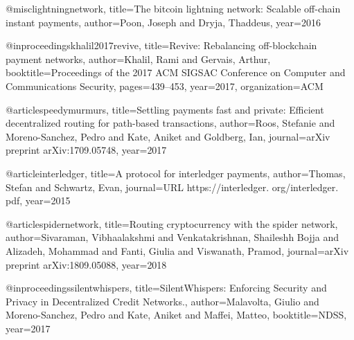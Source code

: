 @misc{lightningnetwork,
  title={The bitcoin lightning network: Scalable off-chain instant payments},
  author={Poon, Joseph and Dryja, Thaddeus},
  year={2016}
}

@inproceedings{khalil2017revive,
  title={Revive: Rebalancing off-blockchain payment networks},
  author={Khalil, Rami and Gervais, Arthur},
  booktitle={Proceedings of the 2017 ACM SIGSAC Conference on Computer and Communications Security},
  pages={439--453},
  year={2017},
  organization={ACM}
}

@article{speedymurmurs,
  title={Settling payments fast and private: Efficient decentralized routing for path-based transactions},
  author={Roos, Stefanie and Moreno-Sanchez, Pedro and Kate, Aniket and Goldberg, Ian},
  journal={arXiv preprint arXiv:1709.05748},
  year={2017}
}

@article{interledger,
  title={A protocol for interledger payments},
  author={Thomas, Stefan and Schwartz, Evan},
  journal={URL https://interledger. org/interledger. pdf},
  year={2015}
}

@article{spidernetwork,
  title={Routing cryptocurrency with the spider network},
  author={Sivaraman, Vibhaalakshmi and Venkatakrishnan, Shaileshh Bojja and Alizadeh, Mohammad and Fanti, Giulia and Viswanath, Pramod},
  journal={arXiv preprint arXiv:1809.05088},
  year={2018}
}

@inproceedings{silentwhispers,
  title={SilentWhispers: Enforcing Security and Privacy in Decentralized Credit Networks.},
  author={Malavolta, Giulio and Moreno-Sanchez, Pedro and Kate, Aniket and Maffei, Matteo},
  booktitle={NDSS},
  year={2017}
}
